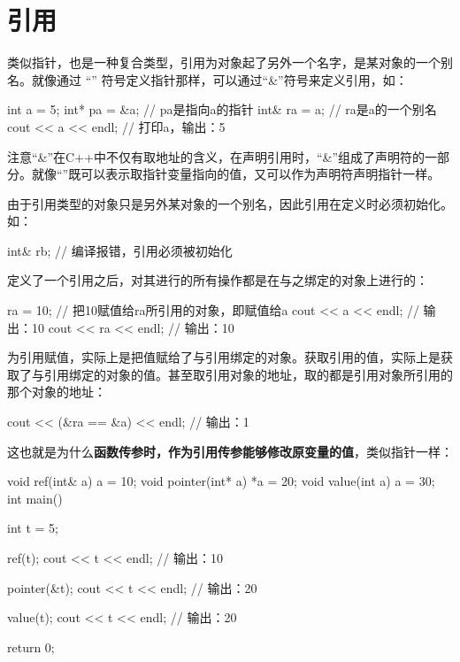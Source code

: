 \section*{引用}
类似指针，也是一种复合类型，引用为对象起了另外一个名字，是某对象的一个别名。就像通过 “\*” 符号定义指针那样，可以通过“\&”符号来定义引用，如：
\begin{cppcode}
    int a = 5;      
    int* pa = &a;   // pa是指向a的指针
    int& ra = a;    // ra是a的一个别名
    cout << a << endl;  // 打印a，输出：5
\end{cppcode}
注意“\&”在C++中不仅有取地址的含义，在声明引用时，“\&”组成了声明符的一部分。就像“\*”既可以表示取指针变量指向的值，又可以作为声明符声明指针一样。

由于引用类型的对象只是另外某对象的一个别名，因此引用在定义时必须初始化。如：
\begin{cppcode}
    int& rb;    // 编译报错，引用必须被初始化
\end{cppcode}

定义了一个引用之后，对其进行的所有操作都是在与之绑定的对象上进行的：
\begin{cppcode}
    ra = 10;    // 把10赋值给ra所引用的对象，即赋值给a
    cout << a << endl;  // 输出：10
    cout << ra << endl; // 输出：10
\end{cppcode}
为引用赋值，实际上是把值赋给了与引用绑定的对象。获取引用的值，实际上是获取了与引用绑定的对象的值。甚至取引用对象的地址，取的都是引用对象所引用的那个对象的地址：
\begin{cppcode}
    cout << (&ra == &a) << endl;    // 输出：1
\end{cppcode}

\vspace{\baselineskip}

这也就是为什么\textbf{函数传参时，作为引用传参能够修改原变量的值}，类似指针一样：
\begin{cppcode}
    void ref(int& a) {
        a = 10;
    }
    void pointer(int* a) {
        *a = 20;
    }
    void value(int a) {
        a = 30;
    }
    int main() {
        int t = 5;
        
        ref(t);
        cout << t << endl;  // 输出：10
        
        pointer(&t);        
        cout << t << endl;  // 输出：20

        value(t);
        cout << t << endl;  // 输出：20

        return 0;
    }
\end{cppcode}

